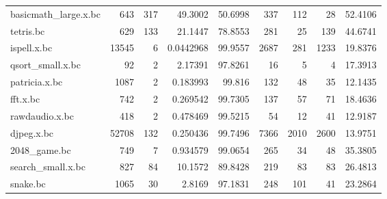\begin{table}[ht]
\begin{adjustbox}{width=1.3\textwidth}
\begin{tabular}{lrrrrrrrr}
 basicmath\_large.x.bc &           643 &                 317 &     49.3002    &       50.6998 &                337 &                              112 &                          28 &       52.4106  \\
 tetris.bc            &           629 &                 133 &     21.1447    &       78.8553 &                281 &                               25 &                         139 &       44.6741  \\
 ispell.x.bc          &         13545 &                   6 &      0.0442968 &       99.9557 &               2687 &                              281 &                        1233 &       19.8376  \\
 qsort\_small.x.bc     &            92 &                   2 &      2.17391   &       97.8261 &                 16 &                                5 &                           4 &       17.3913  \\
 patricia.x.bc        &          1087 &                   2 &      0.183993  &       99.816  &                132 &                               48 &                          35 &       12.1435  \\
 fft.x.bc             &           742 &                   2 &      0.269542  &       99.7305 &                137 &                               57 &                          71 &       18.4636  \\
 rawdaudio.x.bc       &           418 &                   2 &      0.478469  &       99.5215 &                 54 &                               12 &                          41 &       12.9187  \\
 djpeg.x.bc           &         52708 &                 132 &      0.250436  &       99.7496 &               7366 &                             2010 &                        2600 &       13.9751  \\
 2048\_game.bc         &           749 &                   7 &      0.934579  &       99.0654 &                265 &                               34 &                          48 &       35.3805  \\
 search\_small.x.bc    &           827 &                  84 &     10.1572    &       89.8428 &                219 &                               83 &                          83 &       26.4813  \\
 snake.bc             &          1065 &                  30 &      2.8169    &       97.1831 &                248 &                              101 &                          41 &       23.2864  \\

\end{tabular}
\end{adjustbox}
\end{table}
